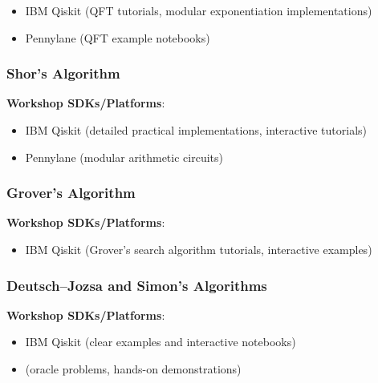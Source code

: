 \begin{itemize}
	\item IBM Qiskit (QFT tutorials, modular exponentiation implementations)
	\item Pennylane (QFT example notebooks)
\end{itemize}


\subsubsection{Shor's Algorithm}

\textbf{Workshop SDKs/Platforms}:

\begin{itemize}
	\item IBM Qiskit (detailed practical implementations, interactive tutorials)
	\item Pennylane (modular arithmetic circuits)
\end{itemize}


\subsubsection{Grover’s Algorithm}

\textbf{Workshop SDKs/Platforms}:

\begin{itemize}
	\item IBM Qiskit (Grover's search algorithm tutorials, interactive examples)
\end{itemize}


\subsubsection{Deutsch–Jozsa and Simon’s Algorithms}

\textbf{Workshop SDKs/Platforms}:

\begin{itemize}
	\item IBM Qiskit (clear examples and interactive notebooks)
	\item (oracle problems, hands-on demonstrations)
\end{itemize}


